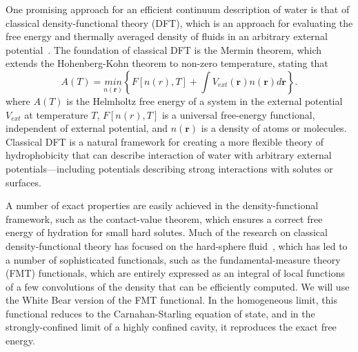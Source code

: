 \documentclass[letterpaper,twocolumn,amsmath,amssymb,prb]{revtex4-1}
\newcommand{\rr}{\textbf{r}}
\begin{document}
One promising approach for an efficient continuum description of water
is that of classical density-functional theory (DFT), which is an
approach for evaluating the free energy and thermally averaged density
of fluids in an arbitrary external potential~\cite{ebner1976density}.
The foundation of classical DFT is the Mermin
theorem\cite{mermin1965thermal}, which extends the Hohenberg-Kohn
theorem\cite{hohenberg1964inhomogeneous} to non-zero temperature,
stating that
\begin{equation}
  A(T) = \underset{n(\rr)}{min}\left\{ F[n(r),T] + \int V_\textit{ext}(\rr) n(\rr)
d\rr\right\}.
\end{equation}
where $A(T)$ is the Helmholtz free energy of a system in the external
potential $V_\textit{ext}$ at temperature $T$, $F[n(r),T]$ is a
universal free-energy functional, independent of external potential,
and $n(\rr)$ is a density of atoms or molecules.  Classical DFT is a
natural framework for creating a more flexible theory of
hydrophobicity that can describe interaction of water with arbitrary
external potentials---including potentials describing strong
interactions with solutes or surfaces.

A number of exact properties are easily achieved in the
density-functional framework, such as the contact-value theorem, which
ensures a correct free energy of hydration for small hard solutes.
Much of the research on classical density-functional theory has
focused on the hard-sphere fluid~\cite{curtin1985, rosenfeld1989,
  rosenfeld1993, rosenfeld1997, tarazona1997, tarazona2000}, which has
led to a number of sophisticated functionals, such as the
fundamental-measure theory (FMT) functionals\cite{rosenfeld1989,
  rosenfeld1993, rosenfeld1997, tarazona1997, tarazona2000,
  roth2002whitebear}, which are entirely expressed as an integral of
local functions of a few convolutions of the density that can be
efficiently computed.  We will use the White Bear version of the FMT
functional\cite{roth2002whitebear}.  In the homogeneous limit, this
functional reduces to the Carnahan-Starling equation of state, and in
the strongly-confined limit of a highly confined cavity, it reproduces
the exact free energy.
\end{document}
